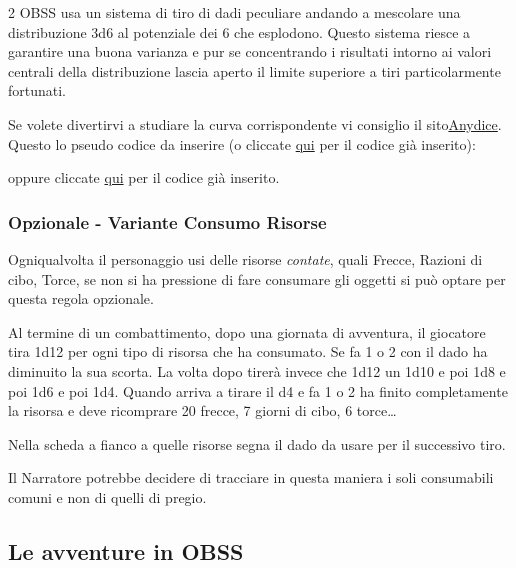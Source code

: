 \begin{multicols}{2}
OBSS usa un sistema di tiro di dadi peculiare andando a mescolare una distribuzione 3d6 al potenziale dei 6 che esplodono. Questo sistema riesce a garantire una buona varianza e pur se concentrando i risultati intorno ai valori centrali della distribuzione lascia aperto il limite superiore a tiri particolarmente fortunati.

Se volete divertirvi a studiare la curva corrispondente vi consiglio il sito\href{https://anydice.com/}{Anydice}. Questo lo pseudo codice da inserire (o cliccate \href{https://anydice.com/program/2610e}{qui} per il codice già inserito):

\medskip


\medskip

oppure cliccate \href{https://anydice.com/program/2610e}{qui} per il codice già inserito.

\subsubsection{Opzionale - Variante Consumo Risorse}\label{varianteconsumorisorse}\hypertarget{varianteconsumorisorse}{}

Ogniqualvolta il personaggio usi delle risorse \emph{contate}, quali Frecce, Razioni di cibo, Torce, se non si ha pressione di fare consumare gli oggetti si può optare per questa regola opzionale.

Al termine di un combattimento, dopo una giornata di avventura, il giocatore tira 1d12 per ogni tipo di risorsa che ha consumato. Se fa 1 o 2 con il dado ha diminuito la sua scorta.
La volta dopo tirerà invece che 1d12 un 1d10 e poi 1d8 e poi 1d6 e poi 1d4. Quando arriva a tirare il d4 e fa 1 o 2 ha finito completamente la risorsa e deve ricomprare 20 frecce, 7 giorni di cibo, 6 torce…

Nella scheda a fianco a quelle risorse segna il dado da usare per il successivo tiro.

Il Narratore potrebbe decidere di tracciare in questa maniera i soli consumabili comuni e non di quelli di pregio.

\subsection{Le avventure in OBSS} \hypertarget{OSR}{} \label{avventureinobss}


\end{multicols}
